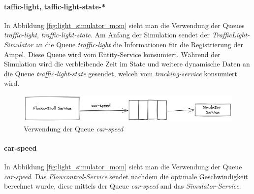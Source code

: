 \paragraph{taffic-light, taffic-light-state-*}
In Abbildung \ref{fig:light_simulator_mom} sieht man die Verwendung der Queues \textit{traffic-light}, \textit{traffic-light-state}. Am Anfang der Simulation sendet der \textit{TrafficLight-Simulator} an die Queue \textit{traffic-light} die Informationen für die Registrierung der Ampel. Diese Queue wird vom Entity-Service konsumiert. Während der Simulation wird die verbleibende Zeit im State und weitere dynamische Daten an die Queue \textit{traffic-light-state} gesendet, welceh vom \textit{tracking-service} konsumiert wird.

\begin{figure}[h]
	\centering
	\includegraphics[width=1\textwidth]{./figures/flow_controll_speed_mom.png}
	\caption{Verwendung der Queue \textit{car-speed}}
	\label{fig:car_speed_mom}
\end{figure}

\paragraph{car-speed}
In Abbildung \ref{fig:light_simulator_mom} sieht man die Verwendung der Queue \textit{car-speed}. Das \textit{Flowcontrol-Service} sendet nachdem die optimale Geschwindigkeit berechnet wurde, diese mittels der Queue \textit{car-speed} and das \textit{Simulator-Service}.
